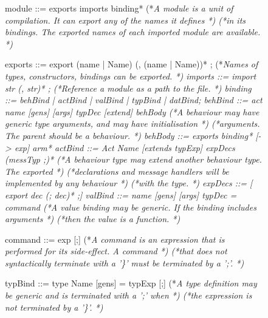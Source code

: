 \documentclass[5p,times]{elsarticle}
\begin{document}
\begin{figure}
\begin{ESL}
module  ::= exports imports binding*                             (*\rmfamily\it A module is a unit of compilation. It can export any of the names it defines *)
                                                                (*\rmfamily\it in its bindings. The exported names of each imported module are available. *)
                                                                 
exports ::= export (name | Name) (, (name | Name))* ;            (*\rmfamily\it Names of types, constructors, bindings can be exported. *)
imports ::= import str (, str)* ;                                (*\rmfamily\it Reference a module as a path to the file. *)
binding ::= behBind | actBind | valBind | typBind | datBind;
behBind ::= act name [gens] [args] typDec [extend] {behBody}     (*\rmfamily\it A behaviour may have generic type arguments, and may have initialisation  *)
                                                                (*\rmfamily\it  arguments. The parent should be a behaviour. *)
behBody ::= exports binding* [-> exp] arm*
actBind ::= Act Name [extends typExp] {expDecs (messTyp ;)*}     (*\rmfamily\it A behaviour type may extend another behaviour type. The exported  *)
                                                                (*\rmfamily\it  declarations and message handlers will be implemented by any behaviour *)
                                                                (*\rmfamily\it  with the type. *)
expDecs ::= [ export dec (; dec)* ;]
valBind ::= name [gens] [args] typDec = command                  (*\rmfamily\it A value binding may be generic. If the binding includes arguments *)
                                                                (*\rmfamily\it then the value is a function. *)
                                                                 
command ::= exp [;]                                              (*\rmfamily\it A command is an expression that is performed for its side-effect. A command *)
                                                                (*\rmfamily\it  that does not syntactically terminate with a '\}' must be terminated by a ';'. *)
                                                                 
typBind ::= type Name [gens] = typExp [;]                        (*\rmfamily\it A type definition may be generic and is terminated with a ';' when *)
                                                                (*\rmfamily\it the expression is not terminated by a '\}'. *)
                                                                 

\end{ESL}
\end{figure}
\end{document}
